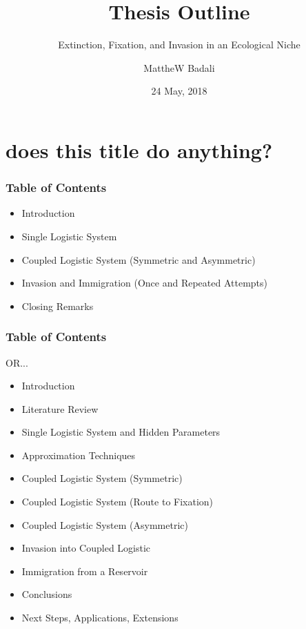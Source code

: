 \documentclass[8pt]{beamer}
\title[Thesis Outline]{Thesis Outline}
\subtitle{Extinction, Fixation, and Invasion in an Ecological Niche}
\author[M.A.Badali]{MattheW Badali}
\date[24/05/2018]{24 May, 2018}
\begin{document}
\frame{\titlepage}


\section[Outline]{does this title do anything?}

\begin{frame}
\frametitle{Table of Contents}
\begin{itemize}
    \item Introduction
    \item Single Logistic System
    \item Coupled Logistic System (Symmetric and Asymmetric)
    \item Invasion and Immigration (Once and Repeated Attempts)
    \item Closing Remarks
\end{itemize}
\end{frame}


\begin{frame}
\frametitle{Table of Contents}
OR...
\begin{itemize}
	\item Introduction
	\item Literature Review
	\item Single Logistic System and Hidden Parameters
	\item Approximation Techniques
	\item Coupled Logistic System (Symmetric)
	\item Coupled Logistic System (Route to Fixation)
	\item Coupled Logistic System (Asymmetric)
	\item Invasion into Coupled Logistic
	\item Immigration from a Reservoir
	\item Conclusions
	\item Next Steps, Applications, Extensions
\end{itemize}
\end{frame}
\end{document}
